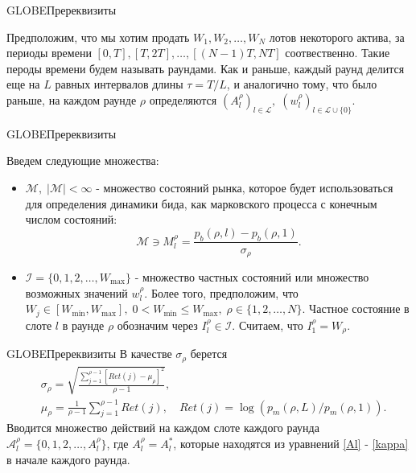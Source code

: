 \documentclass[aspectratio=169]{beamer}
\begin{document}
        \begin{frame}{GLOBE}{Пререквизиты}

            Предположим, что мы хотим продать $W_1, W_2, \ldots, W_N$ лотов некоторого актива, за периоды времени $[0, T], [T, 2T], \ldots, [(N-1)T, NT]$ соотвественно. Такие пероды времени будем называть раундами.
            Как и раньше, каждый раунд делится еще на $L$ равных интервалов длины $\tau = T/L$, и аналогично тому, что было раньше, на каждом раунде $\rho$ определяются $(A_l^\rho)_{l \in \mathcal L}, \; (w_l^\rho)_{l \in \mathcal L \cup \{0\}}$.

        \end{frame}

        \begin{frame}{GLOBE}{Пререквизиты}

            Введем следующие множества:
        
            \begin{itemize}
                \item $\mathcal M , \; |\mathcal M| < \infty$ - множество состояний рынка, которое будет использоваться для определения динамики бида, как марковского процесса с конечным числом состояний:
                \begin{equation*}
                    \mathcal M \ni M_l^\rho = \frac {p_b(\rho, l) - p_b(\rho, 1)}{\sigma_\rho}.
                \end{equation*}
                
                \item $\mathcal I = \{0,1, 2, \ldots, W_{\max} \}$ - множество частных состояний или множество возможных значений $w_l^\rho$. Более того, предположим, что $W_j \in [W_{\min}, W_{\max}], \; 0<W_{\min} \leqslant W_{\max}, \; \rho \in \{1, 2, \ldots, N \}$. Частное состояние в слоте $l$ в раунде $\rho$ обозначим через $I_l^\rho \in \mathcal I$. Считаем, что $I_1^\rho = W_\rho$.
            \end{itemize}
        
        \end{frame}

        \begin{frame}{GLOBE}{Пререквизиты}
            В качестве $\sigma_\rho$ берется
            \begin{align*}
                &\sigma_\rho = \sqrt{\frac {\sum\limits_{j=1}^{\rho -1}[Ret(j) - \mu_\rho ]^2} {\rho - 1} },\\
                &\mu_\rho =  \frac1{\rho -1}\sum_{j=1}^{\rho -1} Ret(j) , \quad Ret(j) =  \log(p_m(\rho, L)/p_m(\rho, 1) ).
            \end{align*}
            Вводится множество действий на каждом слоте каждого раунда $\mathcal A_l^\rho = \{0,1,2,\ldots, A_l^\rho \}$, где $A_l^\rho = A_l^{*}$, которые находятся из уравнений \eqref{Al} - \eqref{kappa} в начале каждого раунда. 
        \end{frame}
\end{document}
